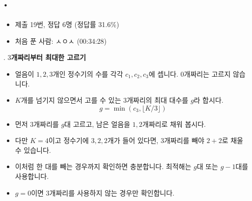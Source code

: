 
\section{\texorpdfstring{\pletter. \ptitle}{문제 \pletter}}

\begin{frame}[label=problem-K]
    \sectiontitle{\pletter}{\ptitle}
    \begin{itemize}
        \item 제출 19번, 정답 6명 (정답률 31.6\%)
        \item 처음 푼 사람: ㅅㅇㅅ (00:34:28)
    \end{itemize}
\end{frame}

\begin{frame}{\textbf{\pletter}. \ptitle}
    \textbf{$3$개짜리부터 최대한 고르기}
\begin{itemize}
        \item 얼음이 $1,2,3$개인 정수기의 수를 각각 $c_1,c_2,c_3$에 셉니다. $0$개짜리는 고르지 않습니다.
        \item $K$개를 넘기지 않으면서 고를 수 있는 $3$개짜리의 최대 대수를 $g$라 합시다.
        \[
            g=\min(c_3,\lfloor K/3\rfloor)
        \]
        \item 먼저 $3$개짜리를 $g$대 고르고, 남은 얼음을 $1,2$개짜리로 채워 봅시다.
        \item 다만 $K=4$이고 정수기에 $3,2,2$개가 들어 있다면, $3$개짜리를 빼야 $2+2$로 채울 수 있습니다.
        \item 이처럼 한 대를 빼는 경우까지 확인하면 충분합니다. 최적해는 $g$대 또는 $g-1$대를 사용합니다.
        \item $g=0$이면 $3$개짜리를 사용하지 않는 경우만 확인합니다.
    \end{itemize}
\end{frame}

